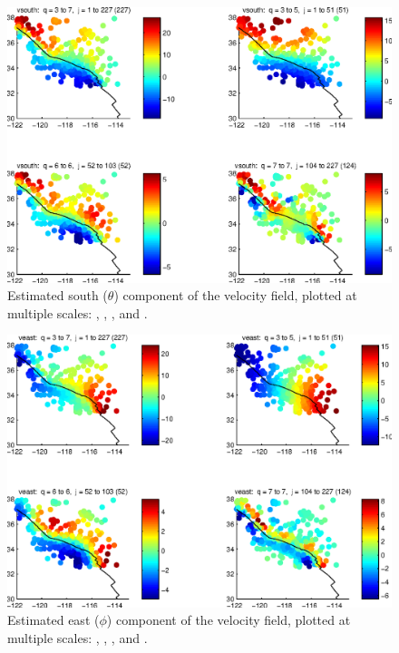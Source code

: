 \documentclass[11pt,titlepage,fleqn]{article}
\begin{document}
\begin{figure}
\includegraphics[width=16cm]{fig2D_B05.eps}
\caption[]
{{
Estimated south ($\theta$) component of the velocity field, plotted at multiple scales: , , , and .
\label{fig:2D_B05}
}}
\end{figure}

\begin{figure}
\includegraphics[width=16cm]{fig2D_B06.eps}
\caption[]
{{
Estimated east ($\phi$) component of the velocity field, plotted at multiple scales: , , , and .
\label{fig:2D_B06}
}}
\end{figure}
\end{document}
